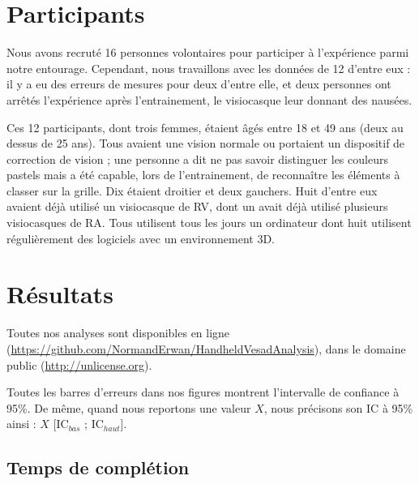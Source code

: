 \section{Participants}
\label{sec:experiment_participants}

Nous avons recruté 16 personnes volontaires pour participer à l'expérience parmi notre entourage. Cependant, nous travaillons avec les données de 12 d'entre eux : il y a eu des erreurs de mesures pour deux d'entre elle, et deux personnes ont arrêtés l'expérience après l'entrainement, le visiocasque leur donnant des nausées.

Ces 12 participants, dont trois femmes, étaient âgés entre 18 et 49 ans (deux au dessus de 25 ans). Tous avaient une vision normale ou portaient un dispositif de correction de vision ; une personne a dit ne pas savoir distinguer les couleurs pastels mais a été capable, lors de l'entrainement, de reconnaître les éléments à classer sur la grille. Dix étaient droitier et deux gauchers. Huit d'entre eux avaient déjà utilisé un visiocasque de RV, dont un avait déjà utilisé plusieurs visiocasques de RA. Tous utilisent tous les jours un ordinateur dont huit utilisent régulièrement des logiciels avec un environnement 3D.


\section{Résultats}
\label{sec:experiment_results}

Toutes nos analyses sont disponibles en ligne (\url{https://github.com/NormandErwan/HandheldVesadAnalysis}), dans le domaine public (\url{http://unlicense.org}).

Toutes les barres d'erreurs dans nos figures montrent l'intervalle de confiance à 95\%. De même, quand nous reportons une valeur $X$, nous précisons son IC à 95\% ainsi : $X$ [$\text{IC}_{bas}$ ; $\text{IC}_{haut}$].

\subsection{Temps de complétion}
\label{subsec:experiment_results_time}


